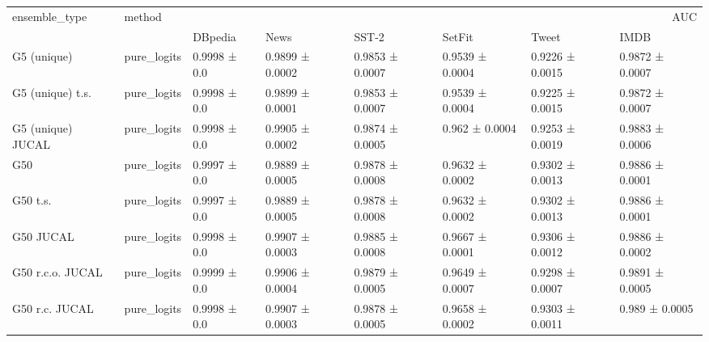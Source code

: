\begin{tabular}{llllllll}
\toprule
ensemble_type & method & \multicolumn{6}{r}{AUC} \\
 &  & DBpedia & News & SST-2 & SetFit & Tweet & IMDB \\
\midrule
G5 (unique) & pure_logits & 0.9998 ± 0.0 & 0.9899 ± 0.0002 & 0.9853 ± 0.0007 & 0.9539 ± 0.0004 & 0.9226 ± 0.0015 & 0.9872 ± 0.0007 \\
G5 (unique) t.s. & pure_logits & 0.9998 ± 0.0 & 0.9899 ± 0.0001 & 0.9853 ± 0.0007 & 0.9539 ± 0.0004 & 0.9225 ± 0.0015 & 0.9872 ± 0.0007 \\
G5 (unique) JUCAL & pure_logits & 0.9998 ± 0.0 & 0.9905 ± 0.0002 & 0.9874 ± 0.0005 & 0.962 ± 0.0004 & 0.9253 ± 0.0019 & 0.9883 ± 0.0006 \\
G50 & pure_logits & 0.9997 ± 0.0 & 0.9889 ± 0.0005 & 0.9878 ± 0.0008 & 0.9632 ± 0.0002 & 0.9302 ± 0.0013 & 0.9886 ± 0.0001 \\
G50 t.s. & pure_logits & 0.9997 ± 0.0 & 0.9889 ± 0.0005 & 0.9878 ± 0.0008 & 0.9632 ± 0.0002 & 0.9302 ± 0.0013 & 0.9886 ± 0.0001 \\
G50 JUCAL & pure_logits & 0.9998 ± 0.0 & 0.9907 ± 0.0003 & 0.9885 ± 0.0008 & 0.9667 ± 0.0001 & 0.9306 ± 0.0012 & 0.9886 ± 0.0002 \\
G50 r.c.o. JUCAL & pure_logits & 0.9999 ± 0.0 & 0.9906 ± 0.0004 & 0.9879 ± 0.0005 & 0.9649 ± 0.0007 & 0.9298 ± 0.0007 & 0.9891 ± 0.0005 \\
G50 r.c. JUCAL & pure_logits & 0.9998 ± 0.0 & 0.9907 ± 0.0003 & 0.9878 ± 0.0005 & 0.9658 ± 0.0002 & 0.9303 ± 0.0011 & 0.989 ± 0.0005 \\
\bottomrule
\end{tabular}
